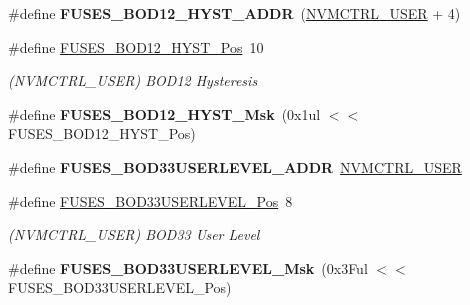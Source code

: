 \begin{DoxyCompactItemize}
\item 
\hypertarget{group__fuses__api_gad62b5e0dd597b31bdffbd7eebd1d313f}{}\#define {\bfseries F\+U\+S\+E\+S\+\_\+\+B\+O\+D12\+\_\+\+H\+Y\+S\+T\+\_\+\+A\+D\+D\+R}~(\hyperlink{group___s_a_m_l21_j18_a__base_ga7a7a83a5753fa323b61536e396083c99}{N\+V\+M\+C\+T\+R\+L\+\_\+\+U\+S\+E\+R} + 4)\label{group__fuses__api_gad62b5e0dd597b31bdffbd7eebd1d313f}

\item 
\hypertarget{group__fuses__api_gae13f49599fc39f7352f07925c3cf2172}{}\#define \hyperlink{group__fuses__api_gae13f49599fc39f7352f07925c3cf2172}{F\+U\+S\+E\+S\+\_\+\+B\+O\+D12\+\_\+\+H\+Y\+S\+T\+\_\+\+Pos}~10\label{group__fuses__api_gae13f49599fc39f7352f07925c3cf2172}

\begin{DoxyCompactList}\small\item\em (N\+V\+M\+C\+T\+R\+L\+\_\+\+U\+S\+E\+R) B\+O\+D12 Hysteresis \end{DoxyCompactList}\item 
\hypertarget{group__fuses__api_gaaf1280f4a23eaa659807b2f3a5d56af0}{}\#define {\bfseries F\+U\+S\+E\+S\+\_\+\+B\+O\+D12\+\_\+\+H\+Y\+S\+T\+\_\+\+Msk}~(0x1ul $<$$<$ F\+U\+S\+E\+S\+\_\+\+B\+O\+D12\+\_\+\+H\+Y\+S\+T\+\_\+\+Pos)\label{group__fuses__api_gaaf1280f4a23eaa659807b2f3a5d56af0}

\item 
\hypertarget{group__fuses__api_ga4fad8c709dc5dec570b92db72eace451}{}\#define {\bfseries F\+U\+S\+E\+S\+\_\+\+B\+O\+D33\+U\+S\+E\+R\+L\+E\+V\+E\+L\+\_\+\+A\+D\+D\+R}~\hyperlink{group___s_a_m_l21_j18_a__base_ga7a7a83a5753fa323b61536e396083c99}{N\+V\+M\+C\+T\+R\+L\+\_\+\+U\+S\+E\+R}\label{group__fuses__api_ga4fad8c709dc5dec570b92db72eace451}

\item 
\hypertarget{group__fuses__api_ga9e8109cd0996312419933645a2f2a089}{}\#define \hyperlink{group__fuses__api_ga9e8109cd0996312419933645a2f2a089}{F\+U\+S\+E\+S\+\_\+\+B\+O\+D33\+U\+S\+E\+R\+L\+E\+V\+E\+L\+\_\+\+Pos}~8\label{group__fuses__api_ga9e8109cd0996312419933645a2f2a089}

\begin{DoxyCompactList}\small\item\em (N\+V\+M\+C\+T\+R\+L\+\_\+\+U\+S\+E\+R) B\+O\+D33 User Level \end{DoxyCompactList}\item 
\hypertarget{group__fuses__api_ga830dd49d8c3e2d1f2ab5f77a901315c3}{}\#define {\bfseries F\+U\+S\+E\+S\+\_\+\+B\+O\+D33\+U\+S\+E\+R\+L\+E\+V\+E\+L\+\_\+\+Msk}~(0x3\+Ful $<$$<$ F\+U\+S\+E\+S\+\_\+\+B\+O\+D33\+U\+S\+E\+R\+L\+E\+V\+E\+L\+\_\+\+Pos)\label{group__fuses__api_ga830dd49d8c3e2d1f2ab5f77a901315c3}


\end{DoxyCompactItemize}
